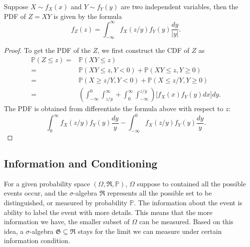 \begin{theorem}
Suppose $X\sim f_X(x)$ and $Y\sim f_Y(y)$ are two independent variables, then the PDF of $Z=XY$ is given by the formula
\begin{equation}
f_{Z}(z)=\int_{-\infty}^\infty f_X(z/y)f_Y(y)\frac{dy}{|y|}.
\end{equation} 
\end{theorem}
\begin{proof}
To get the PDF of the $Z$, we first construct the CDF of $Z$ as
\begin{equation}
\begin{aligned}
\mathbb{P}(Z\le z)=&\mathbb{P}(XY\le z)\\
=&\mathbb{P}(XY\le z,Y<0)+\mathbb{P}(XY\le z,Y\ge 0)\\
=&\mathbb{P}(X\ge z/Y,Y<0)+\mathbb{P}(X\le z/Y,Y\ge0)\\
=&\left(\int_{-\infty}^0\int_{z/y}^\infty +\int_0^\infty \int_{-\infty}^{z/y}\right)\bigg[f_X(x)f_Y(y)dx\bigg]dy.
\end{aligned}
\end{equation}
The PDF is obtained from differentiate the formula above with respect to $z$:
\begin{equation}
\int^{\infty}_0f_X(z/y)f_Y(y)\frac{dy}{y}-\int_{-\infty}^0f_X(z/y)f_Y(y)\frac{dy}{y}.
\end{equation}
\end{proof}


\subsection{Information and Conditioning}
For a given probability space $(\Omega, \mathfrak{R},\mathbb{P})$, $\Omega$ suppose to contained all the possible events occur, and the $\sigma$-algebra $\mathfrak{R}$ represents all the possible set to be distinguished, or measured by probability $\mathbb{P}$. The information about the event is ability to label the event with more details. This means that the more information we have, the smaller subset of $\Omega$ can be measured. Based on this idea, a $\sigma$-algebra $\mathfrak{G}\subseteq \mathfrak{R}$ stays for the limit we can measure under certain information condition.

